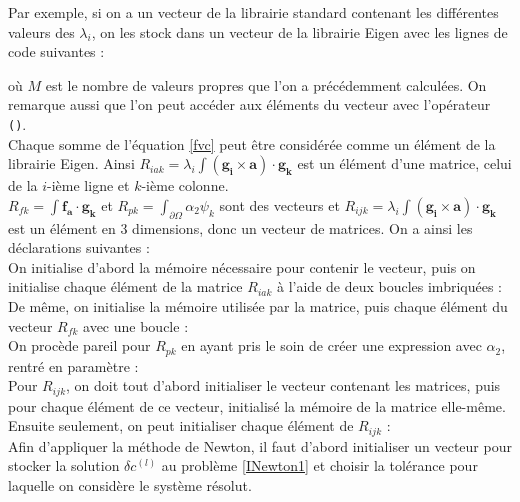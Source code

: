 Par exemple, si on a un vecteur de la librairie standard contenant les différentes valeurs des $\lambda_i$, on les stock dans un vecteur de la librairie Eigen avec les lignes de code suivantes : 

où $M$ est le nombre de valeurs propres que l'on a précédemment calculées. On remarque aussi que l'on peut accéder aux éléments du vecteur avec l'opérateur \texttt{()}.\\

Chaque somme de l'équation \ref{fvc} peut être considérée comme un élément de la librairie Eigen. Ainsi $R_{iak}=\lambda_i\int (\mathbf{g_i}\times\mathbf{a})\cdot\mathbf{g_k}$ est un élément d'une matrice, celui de la $i$-ième ligne et $k$-ième colonne.\\
$R_{fk} = \int \mathbf{f_a}\cdot\mathbf{g_k}$ et $R_{pk} = \int_{\partial\Omega}\alpha_2\psi_k$ sont des vecteurs et $R_{ijk} = \lambda_i\int (\mathbf{g_i}\times\mathbf{a})\cdot\mathbf{g_k}$ est un élément en 3 dimensions, donc un vecteur de matrices. On a ainsi les déclarations suivantes :\\


On initialise d'abord la mémoire nécessaire pour contenir le vecteur, puis on initialise chaque élément de la matrice $R_{iak}$ à l'aide de deux boucles imbriquées :\\


De même, on initialise la mémoire utilisée par la matrice, puis chaque élément du vecteur $R_{fk}$ avec une boucle :\\


On procède pareil pour $R_{pk}$ en ayant pris le soin de créer une expression avec $\alpha_2$, rentré en paramètre :\\


Pour $R_{ijk}$, on doit tout d'abord initialiser le vecteur contenant les matrices, puis pour chaque élément de ce vecteur, initialisé la mémoire de la matrice elle-même. Ensuite seulement, on peut initialiser chaque élément de $R_{ijk}$ :\\


Afin d'appliquer la méthode de Newton, il faut d'abord initialiser un vecteur pour stocker la solution $\delta c^{(l)}$ au problème \ref{INewton1} et choisir la tolérance pour laquelle on considère le système résolut.\\


